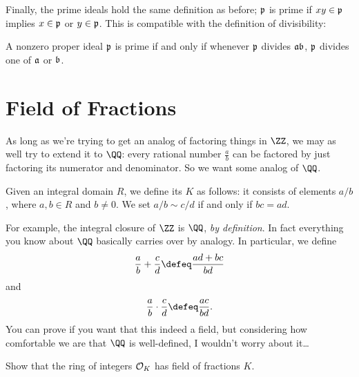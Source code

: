 Finally, the prime ideals hold the same definition as before;
$\pp$ is prime if $xy \in \pp$ implies $x \in \pp$ or $y \in \pp$.
This is compatible with the definition of divisibility:
\begin{exercise}
	A nonzero proper ideal $\pp$ is prime
	if and only if whenever $\pp$ divides $\aa \bb$,
	$\pp$ divides one of $\aa$ or $\bb$.
\end{exercise}


\section{Field of Fractions}
As long as we're trying to get an analog of factoring things in $\ZZ$,
we may as well try to extend it to $\QQ$: every rational number $\frac ab$ can be
factored by just factoring its numerator and denominator.
So we want some analog of $\QQ$.

Given an integral domain $R$, we define its  $K$ as follows:
it consists of elements $a / b$, where $a,b \in R$ and $b \neq 0$.
We set $a / b \sim c / d$ if and only if $bc = ad$.

For example, the integral closure of $\ZZ$ is $\QQ$, \emph{by definition}.
In fact everything you know about $\QQ$ basically carries over by analogy.
In particular, we define
\[ \frac ab + \frac cd \defeq \frac{ad+bc}{bd} \]
and
\[ \frac ab \cdot \frac cd \defeq \frac{ac}{bd}. \]
You can prove if you want that this indeed a field, but 
considering how comfortable we are that $\QQ$ is well-defined,
I wouldn't worry about it\dots

\begin{exercise}
	Show that the ring of integers $\OO_K$ has field of fractions $K$.
\end{exercise}

